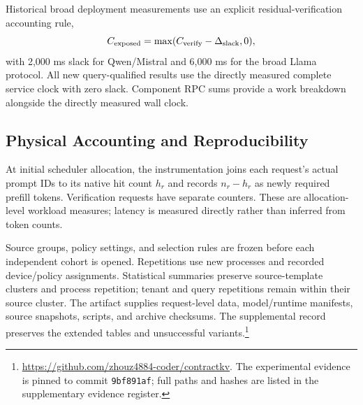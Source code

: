 Historical broad deployment measurements use an explicit residual-verification accounting rule,
\begin{equation}
 C_{\rm exposed}=\max(C_{\rm verify}-\Delta_{\rm slack},0),
\label{eq:slack}
\end{equation}
with 2,000 ms slack for Qwen/Mistral and 6,000 ms for the broad Llama protocol. All new query-qualified results use the directly measured complete service clock with zero slack. Component RPC sums provide a work breakdown alongside the directly measured wall clock.

\subsection{Physical Accounting and Reproducibility}
At initial scheduler allocation, the instrumentation joins each request's actual prompt IDs to its native hit count $h_r$ and records $n_r-h_r$ as newly required prefill tokens. Verification requests have separate counters. These are allocation-level workload measures; latency is measured directly rather than inferred from token counts.

Source groups, policy settings, and selection rules are frozen before each independent cohort is opened. Repetitions use new processes and recorded device/policy assignments. Statistical summaries preserve source-template clusters and process repetition; tenant and query repetitions remain within their source cluster. The artifact supplies request-level data, model/runtime manifests, source snapshots, scripts, and archive checksums. The supplemental record preserves the extended tables and unsuccessful variants.\footnote{\url{https://github.com/zhouz4884-coder/contractkv}. The experimental evidence is pinned to commit \texttt{9bf891af}; full paths and hashes are listed in the supplementary evidence register.}
